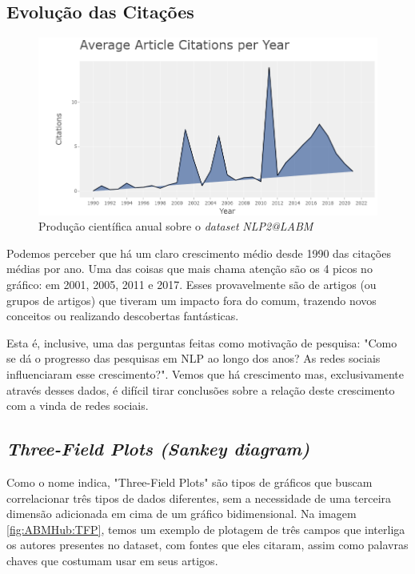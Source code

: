 \subsection{Evolução das Citações}

 \begin{figure}
    \centering
    \includegraphics[width=1\textwidth]{experiments/ABMHub/PesquisaBibliometrica/NLP/citationsPerYear.png}
    \caption{Produção científica anual sobre o \textit{dataset} \textit{NLP2@LABM}}
    \label{fig:ABMHub:CPY}
\end{figure}

Podemos perceber que há um claro crescimento médio desde 1990 das citações médias por ano. Uma das coisas que mais chama atenção são os 4 picos no gráfico: em 2001, 2005, 2011 e 2017. Esses provavelmente são de artigos (ou grupos de artigos) que tiveram um impacto fora do comum, trazendo novos conceitos ou realizando descobertas fantásticas.

Esta é, inclusive, uma das perguntas feitas como motivação de pesquisa: "Como se dá o progresso das pesquisas em NLP ao longo dos anos? As redes sociais influenciaram esse crescimento?". Vemos que há crescimento mas, exclusivamente através desses dados, é difícil tirar conclusões sobre a relação deste crescimento com a vinda de redes sociais. 

\subsection{\textit{Three-Field Plots (Sankey diagram)}}

Como o nome indica, "Three-Field Plots" são tipos de gráficos que buscam correlacionar três tipos de dados diferentes, sem a necessidade de uma terceira dimensão adicionada em cima de um gráfico bidimensional. Na imagem \ref{fig:ABMHub:TFP}, temos um exemplo de plotagem de três campos que interliga os autores presentes no dataset, com fontes que eles citaram, assim como palavras chaves que costumam usar em seus artigos. 

